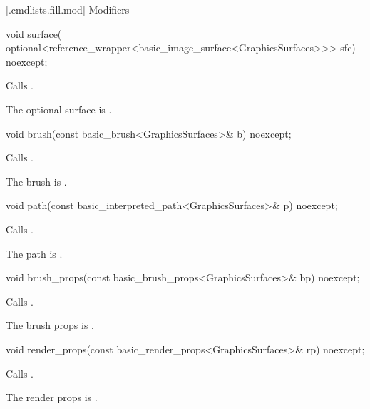  [\iotwod.cmdlists.fill.mod] {Modifiers}%

%
\begin{itemdecl}
void surface(
  optional<reference_wrapper<basic_image_surface<GraphicsSurfaces>>> sfc) 
  noexcept;
\end{itemdecl}
\begin{itemdescr}
\pnum
\effects Calls .

\pnum
\remarks The optional surface is .
\end{itemdescr}

%
\begin{itemdecl}
void brush(const basic_brush<GraphicsSurfaces>& b) noexcept;
\end{itemdecl}
\begin{itemdescr}
\pnum
\effects Calls .

\pnum
\remarks The brush is .
\end{itemdescr}

%
\begin{itemdecl}
void path(const basic_interpreted_path<GraphicsSurfaces>& p) noexcept;
\end{itemdecl}
\begin{itemdescr}
\pnum
\effects Calls .

\pnum
\remarks The path is .
\end{itemdescr}

%
\begin{itemdecl}
void brush_props(const basic_brush_props<GraphicsSurfaces>& bp) noexcept;
\end{itemdecl}
\begin{itemdescr}
\pnum
\effects Calls .

\pnum
\remarks The brush props is .
\end{itemdescr}

%
\begin{itemdecl}
void render_props(const basic_render_props<GraphicsSurfaces>& rp) noexcept;
\end{itemdecl}
\begin{itemdescr}
\pnum
\effects Calls .

\pnum
\remarks The render props is .
\end{itemdescr}

